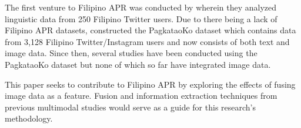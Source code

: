 The first venture to Filipino APR was conducted by \citet{tighe_modeling_2018} wherein they analyzed linguistic data from 250 Filipino Twitter users. Due to there being a lack of Filipino APR datasets, \citet{Tighe_Acorda_Agno_Gano_Go_Santiago_Sedillo_2022} constructed the PagkataoKo dataset which contains data from 3,128 Filipino Twitter/Instagram users and now consists of both text and image data. Since then, several studies have been conducted using the PagkataoKo dataset but none of which so far have integrated image data.

This paper seeks to contribute to Filipino APR by exploring the effects of fusing image data as a feature. Fusion and information extraction techniques from previous multimodal studies would serve as a guide for this research’s methodology.







